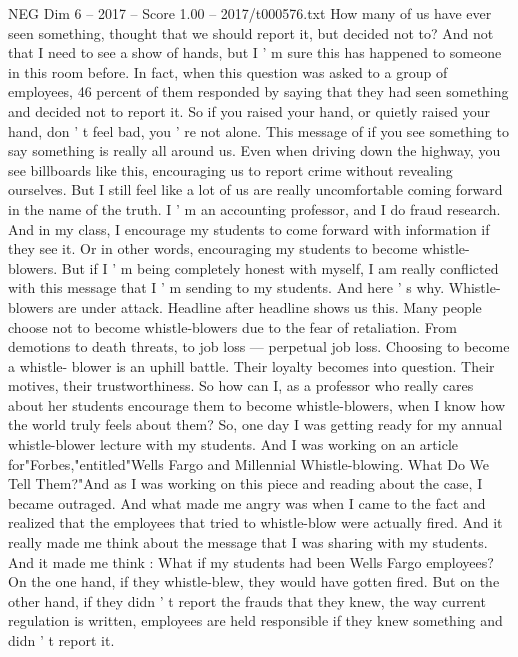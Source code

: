 \begin{textsample}{NEG Dim 6 – 2017 – Score 1.00 – 2017/t000576.txt}  \label{ex:f6_neg_021}
How many of us have ever seen something, thought that we should report it, but decided not to?
And not that I need to see a show of hands, but I ' m sure this has happened to someone in this room before.
In fact, when this question was asked to a group of employees, 46 percent of them responded by saying that they had seen something and decided not to report it.
So if you raised your hand, or quietly raised your hand, don ' t feel bad, you ' re not alone.
This message of if you see something to say something is really all around us.
Even when driving down the highway, you see billboards like this, encouraging us to report crime without revealing ourselves.
But I still feel like a lot of us are really uncomfortable coming forward in the name of the truth.
I ' m an accounting professor, and I do fraud research.
And in my class, I encourage my students to come forward with information if they see it.
Or in other words, encouraging my students to become whistle-blowers.
But if I ' m being completely honest with myself, I am really conflicted with this message that I ' m sending to my students.
And here ' s why.
Whistle-blowers are under attack.
Headline after headline shows us this.
Many people choose not to become whistle-blowers due to the fear of retaliation.
From demotions to death threats, to job loss — perpetual job loss.
Choosing to become a whistle- blower is an uphill battle.
Their loyalty becomes into question.
Their motives, their trustworthiness.
So how can I, as a professor who really cares about her students encourage them to become whistle-blowers, when I know how the world truly feels about them?
So, one day I was getting ready for my annual whistle-blower lecture with my students.
And I was working on an article for"Forbes,"entitled"Wells Fargo and Millennial Whistle-blowing.
What Do We Tell Them?"And as I was working on this piece and reading about the case, I became outraged.
And what made me angry was when I came to the fact and realized that the employees that tried to whistle-blow were actually fired.
And it really made me think about the message that I was sharing with my students.
And it made me think : What if my students had been Wells Fargo employees?
On the one hand, if they whistle-blew, they would have gotten fired.
But on the other hand, if they didn ' t report the frauds that they knew, the way current regulation is written, employees are held responsible if they knew something and didn ' t report it.

\end{textsample}
